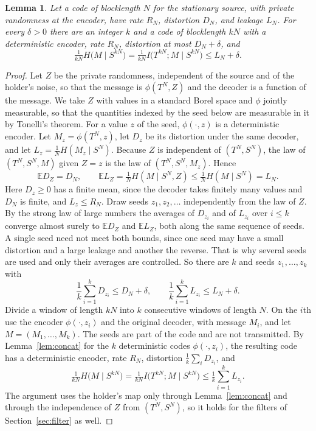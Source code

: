 \documentclass[11pt,onecolumn]{IEEEtran}
\newtheorem{lemma}[theorem]{Lemma}
\newcommand{\E}{\mathbb{E}}
\begin{document}
\begin{lemma}\label{lem:derand}
Let a code of blocklength $N$ for the stationary source, with private
randomness at the encoder, have rate $R_N$, distortion $D_N$, and
leakage $L_N$. For every $\delta>0$ there are an integer $k$ and a code
of blocklength $kN$ with a deterministic encoder, rate $R_N$, distortion
at most $D_N+\delta$, and
\[
\tfrac1{kN}H\bigl(M\mid S^{kN}\bigr)=\tfrac1{kN}I\bigl(T^{kN};M\mid S^{kN}\bigr)\le L_N+\delta .
\]
\end{lemma}

\begin{proof}
Let $Z$ be the private randomness, independent of the source and of the
holder's noise, so that the message is $\phi(T^N,Z)$ and the decoder is
a function of the message. We take $Z$ with values in a standard Borel
space and $\phi$ jointly measurable, so that the quantities indexed by
the seed below are measurable in it by Tonelli's theorem. For a value $z$
of the seed, $\phi(\cdot,z)$ is a deterministic encoder. Let
$M_z=\phi(T^N,z)$, let $D_z$ be its distortion under the same decoder,
and let $L_z=\tfrac1NH(M_z\mid S^N)$. Because $Z$ is independent of
$(T^N,S^N)$, the law of $(T^N,S^N,M)$ given $Z=z$ is the law of
$(T^N,S^N,M_z)$. Hence
\[
\E D_Z=D_N,\qquad \E L_Z=\tfrac1NH(M\mid S^N,Z)\le\tfrac1NH(M\mid S^N)=L_N .
\]
Here $D_z\ge0$ has a finite mean, since the decoder takes finitely
many values and $D_N$ is finite, and $L_z\le R_N$. Draw seeds
$z_1,z_2,\dots$ independently from the law of $Z$. By the strong law of
large numbers the averages of $D_{z_i}$ and of $L_{z_i}$ over
$i\le k$ converge almost surely to $\E D_Z$ and $\E L_Z$, both along the
same sequence of seeds. A single seed need not meet both bounds, since
one seed may have a small distortion and a large leakage and another
the reverse. That is why several seeds are used and only their
averages are controlled. So there are
$k$ and seeds $z_1,\dots,z_k$ with
\[
\frac1k\sum_{i=1}^kD_{z_i}\le D_N+\delta,\qquad
\frac1k\sum_{i=1}^kL_{z_i}\le L_N+\delta .
\]
Divide a window of length $kN$ into $k$ consecutive windows of length
$N$. On the $i$th use the encoder $\phi(\cdot,z_i)$ and the original
decoder, with message $M_i$, and let $M=(M_1,\dots,M_k)$. The seeds are
part of the code and are not transmitted. By Lemma~\ref{lem:concat}
for the $k$ deterministic codes $\phi(\cdot,z_i)$, the resulting code has
a deterministic encoder, rate $R_N$, distortion
$\tfrac1k\sum_iD_{z_i}$, and
\[
\tfrac1{kN}H\bigl(M\mid S^{kN}\bigr)=\tfrac1{kN}I\bigl(T^{kN};M\mid S^{kN}\bigr)\le\tfrac1k\sum_{i=1}^kL_{z_i}.
\]
The argument uses the holder's map only through
Lemma~\ref{lem:concat} and through the independence of $Z$ from
$(T^N,S^N)$, so it holds for the filters of Section~\ref{sec:filter} as
well.
\end{proof}
\end{document}
